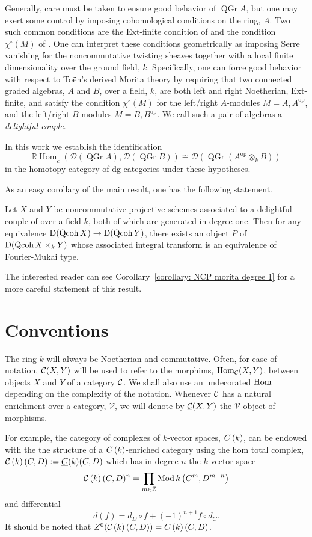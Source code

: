 Generally, care must be taken to ensure good behavior of \(\operatorname{QGr} A\), but one may exert some control by imposing cohomological conditions on the ring, \(A\).
Two such common conditions are the Ext-finite condition of \parencite{BVdB} and the condition \(\chi^\circ(M)\) of \parencite{AZ94}.
One can interpret these conditions geometrically as imposing Serre vanishing for the noncommutative twisting sheaves together with a local finite dimensionality over the ground field, \(k\).
Specifically, one can force good behavior with respect to To\"en's derived Morita theory by requiring that two connected graded algebras, \(A\) and \(B\), over a field, \(k\), are both left and right Noetherian, Ext-finite, and satisfy the condition \(\chi^\circ(M)\) for the left/right \(A\)-modules \(M = A, A^{\operatorname{op}}\), and the left/right \(B\)-modules \(M = B, B^{\operatorname{op}}\).
We call such a pair of algebras a \textit{delightful couple}.

In this work we establish the identification
\[\mathbb{R}\underline{\operatorname{Hom}}_c(\mathcal{D}(\operatorname{QGr} A), \mathcal{D}(\operatorname{QGr} B)) \cong \mathcal{D}(\operatorname{QGr}(A^{\operatorname{op}} \otimes_k B))\]
in the homotopy category of dg-categories under these hypotheses.

As an easy corollary of the main result, one has the following statement.
\begin{theorem}
  Let \(X\) and \(Y\) be noncommutative projective schemes associated to a delightful couple of over a field \(k\), both of which are generated in degree one.
  Then for any equivalence \(\mathrm{D}(\operatorname{Qcoh}X) \to \mathrm{D}(\operatorname{Qcoh}Y)\), there exists an object \(P\) of \(\mathrm{D}(\operatorname{Qcoh}X \times_k Y)\) whose associated integral transform is an equivalence of Fourier-Mukai type.
\end{theorem}

\noindent
The interested reader can see Corollary~\ref{corollary: NCP morita degree 1} for a more careful statement of this result.

\section*{Conventions}
The ring \(k\) will always be Noetherian and commutative.
Often, for ease of notation, \(\mathcal{C}(X,Y)\) will be used to refer to the morphims, \(\operatorname{Hom}_{\mathcal{C}}(X,Y)\), between objects \(X\) and \(Y\) of a category \(\mathcal{C}\). We shall also use an undecorated \(\operatorname{Hom}\) depending on the complexity of the notation. 
Whenever \(\mathcal{C}\) has a natural enrichment over a category, \(\mathcal{V}\), we will denote by \(\underline{\mathcal{C}}(X,Y)\) the \(\mathcal{V}\)-object of morphisms.

For example, the category of complexes of \(k\)-vector spaces, \(C\left(k\right)\), can be endowed with the the structure of a \(C\left(k\right)\)-enriched category using the hom total complex, \(\mathcal{C}\left(k\right)(C,D) := \underline{C}(k)(C,D)\) which has in degree \(n\) the \(k\)-vector space
\[\mathcal{C}\left(k\right)(C,D)^n = \prod_{m \in \mathbb{Z}}\operatorname{Mod}k\left(C^m, D^{m + n}\right)\]
and differential
\[d(f) = d_D \circ f + (-1)^{n+1} f \circ d_C.\]
It should be noted that \(Z^0(\mathcal{C}\left(k\right)(C,D)) = C\left(k\right)(C,D)\).

